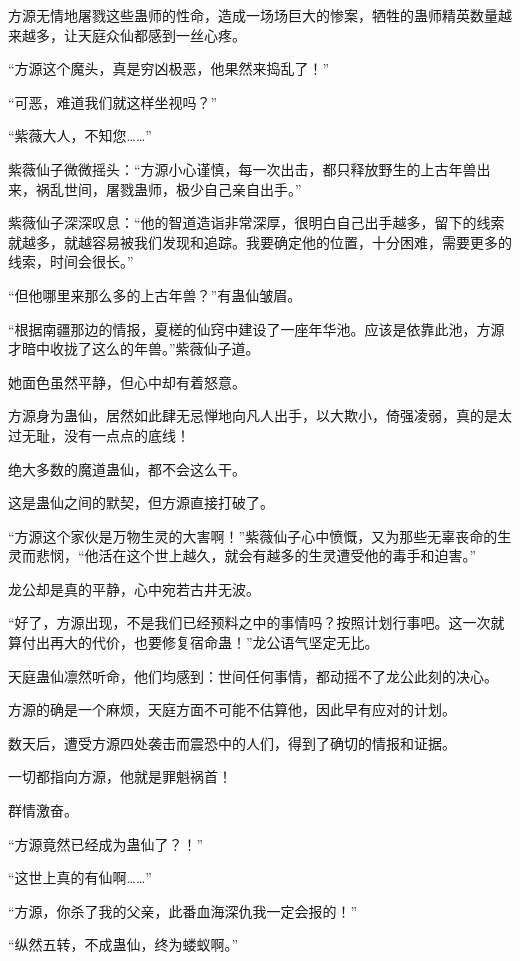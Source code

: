 \begin{this_body}
方源无情地屠戮这些蛊师的性命，造成一场场巨大的惨案，牺牲的蛊师精英数量越来越多，让天庭众仙都感到一丝心疼。

“方源这个魔头，真是穷凶极恶，他果然来捣乱了！”

“可恶，难道我们就这样坐视吗？”

“紫薇大人，不知您……”

紫薇仙子微微摇头：“方源小心谨慎，每一次出击，都只释放野生的上古年兽出来，祸乱世间，屠戮蛊师，极少自己亲自出手。”

紫薇仙子深深叹息：“他的智道造诣非常深厚，很明白自己出手越多，留下的线索就越多，就越容易被我们发现和追踪。我要确定他的位置，十分困难，需要更多的线索，时间会很长。”

“但他哪里来那么多的上古年兽？”有蛊仙皱眉。

“根据南疆那边的情报，夏槎的仙窍中建设了一座年华池。应该是依靠此池，方源才暗中收拢了这么的年兽。”紫薇仙子道。

她面色虽然平静，但心中却有着怒意。

方源身为蛊仙，居然如此肆无忌惮地向凡人出手，以大欺小，倚强凌弱，真的是太过无耻，没有一点点的底线！

绝大多数的魔道蛊仙，都不会这么干。

这是蛊仙之间的默契，但方源直接打破了。

“方源这个家伙是万物生灵的大害啊！”紫薇仙子心中愤慨，又为那些无辜丧命的生灵而悲悯，“他活在这个世上越久，就会有越多的生灵遭受他的毒手和迫害。”

龙公却是真的平静，心中宛若古井无波。

“好了，方源出现，不是我们已经预料之中的事情吗？按照计划行事吧。这一次就算付出再大的代价，也要修复宿命蛊！”龙公语气坚定无比。

天庭蛊仙凛然听命，他们均感到：世间任何事情，都动摇不了龙公此刻的决心。

方源的确是一个麻烦，天庭方面不可能不估算他，因此早有应对的计划。

数天后，遭受方源四处袭击而震恐中的人们，得到了确切的情报和证据。

一切都指向方源，他就是罪魁祸首！

群情激奋。

“方源竟然已经成为蛊仙了？！”

“这世上真的有仙啊……”

“方源，你杀了我的父亲，此番血海深仇我一定会报的！”

“纵然五转，不成蛊仙，终为蝼蚁啊。”


\end{this_body}
